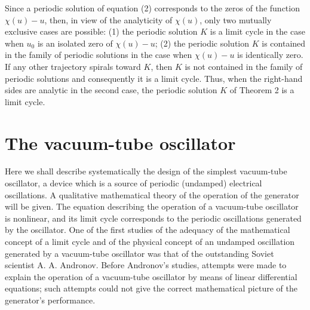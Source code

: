 \documentclass[10pt,a5paper]{book}
\theoremstyle{plain}
\theoremstyle{definition}
\theoremstyle{remark}
\begin{document}
Since a periodic solution of equation (2) corresponds to the zeros of the function $\chi(u)-u$, then, in view of the analyticity of $\chi(u)$, only two mutually exclusive cases are possible: (1) the periodic solution $K$ is a limit cycle in the case when $u_{0}$ is an isolated zero of $\chi(u)-u$; (2) the periodic solution $K$ is contained in the family of periodic solutions in the case when $\chi(u)-u$ is identically zero. If any other trajectory spirals toward $K$, then $K$ is not contained in the family of periodic solutions and consequently it is a limit cycle. Thus, when the right-hand sides are analytic in the second case, the periodic solution $K$ of Theorem 2 is a limit cycle.

\section{The vacuum-tube oscillator}
Here we shall describe systematically the design of the simplest vacuum-tube oscillator, a device which is a source of periodic (undamped) electrical oscillations. A qualitative mathematical theory of the operation of the generator will be given. The equation describing the operation of a vacuum-tube oscillator is nonlinear, and its limit cycle corresponds to the periodic oscillations generated by the oscillator. One of the first studies of the adequacy of the mathematical concept of a limit cycle and of the physical concept of an undamped oscillation generated by a vacuum-tube oscillator was that of the outstanding Soviet scientist A. A. Andronov. Before Andronov's studies, attempts were made to explain the operation of a vacuum-tube oscillator by means of linear differential equations; such attempts could not give the correct mathematical picture of the generator's performance.
\end{document}
